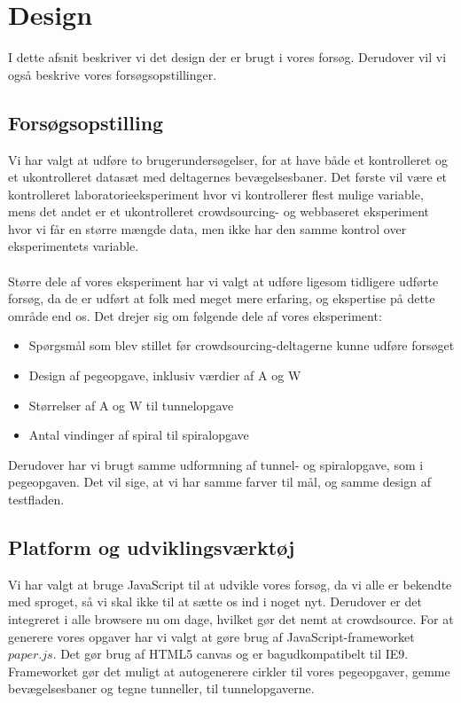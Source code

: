 \newpage
{}
\chapter*{Design}
I dette afsnit beskriver vi det design der er brugt i vores forsøg. Derudover vil vi også beskrive vores forsøgsopstillinger.

\section*{Forsøgsopstilling}
Vi har valgt at udføre to brugerundersøgelser, for at have både et kontrolleret og et ukontrolleret datasæt med deltagernes bevægelsesbaner.
Det første vil være et kontrolleret laboratorieeksperiment hvor vi kontrollerer flest mulige variable, mens det andet er et ukontrolleret crowdsourcing- og webbaseret eksperiment hvor vi får en større mængde data, men ikke har den samme kontrol over eksperimentets variable.\\\\
Større dele af vores eksperiment har vi valgt at udføre ligesom tidligere udførte forsøg, da de er udført at folk med meget mere erfaring, og ekspertise på dette område end os.
Det drejer sig om følgende dele af vores eksperiment:
\begin{itemize}
\item Spørgsmål som blev stillet før crowdsourcing-deltagerne kunne udføre forsøget\cite{goldberg2015}
\item Design af pegeopgave, inklusiv værdier af A og W\cite{goldberg2015}
\item Størrelser af A og W til tunnelopgave\cite{accot1997}
\item Antal vindinger af spiral til spiralopgave\cite{accot1997}
\end{itemize}
Derudover har vi brugt samme udformning af tunnel- og spiralopgave, som i pegeopgaven. Det vil sige, at vi har samme farver til mål, og samme design af testfladen.

\section*{Platform og udviklingsværktøj}
Vi har valgt at bruge JavaScript til at udvikle vores forsøg, da vi alle er bekendte med sproget, så vi skal ikke til at sætte os ind i noget nyt. Derudover er det integreret i alle browsere nu om dage, hvilket gør det nemt at crowdsource. For at generere vores opgaver har vi valgt at gøre brug af JavaScript-frameworket $paper.js$. Det gør brug af HTML5 canvas og er bagudkompatibelt til IE9. Frameworket gør det muligt at autogenerere cirkler til vores pegeopgaver, gemme bevægelsesbaner og tegne tunneller, til tunnelopgaverne.

